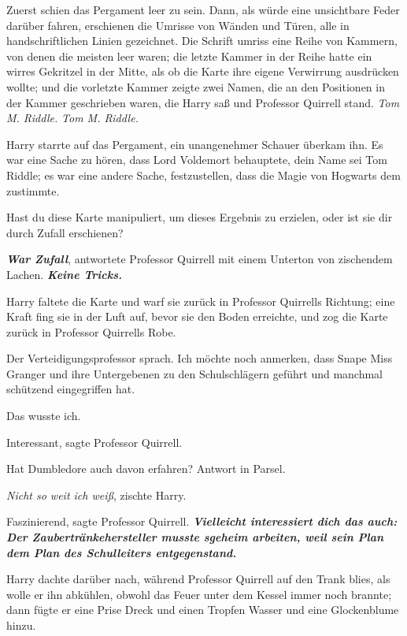 Zuerst schien das Pergament leer zu sein. Dann, als würde eine unsichtbare Feder
darüber fahren, erschienen die Umrisse von Wänden und Türen, alle in
handschriftlichen Linien gezeichnet. Die Schrift umriss eine Reihe von Kammern,
von denen die meisten leer waren; die letzte Kammer in der Reihe hatte ein
wirres Gekritzel in der Mitte, als ob die Karte ihre eigene Verwirrung
ausdrücken wollte; und die vorletzte Kammer zeigte zwei Namen, die an den
Positionen in der Kammer geschrieben waren, die Harry saß und Professor Quirrell
stand. \emph{ Tom M. Riddle.}
\emph{Tom M. Riddle.}

Harry starrte auf das Pergament, ein unangenehmer Schauer überkam ihn. Es war
eine Sache zu hören, dass Lord Voldemort behauptete, dein Name sei Tom Riddle;
es war eine andere Sache, festzustellen, dass die Magie von Hogwarts dem
zustimmte.

\glqq{}Hast du diese Karte manipuliert, um dieses Ergebnis zu erzielen, oder ist
sie dir durch Zufall erschienen?\grqq{}

\glqq{}\textbf{\emph{War Zufall}}\grqq{}, antwortete Professor Quirrell mit einem
Unterton von zischendem Lachen. \glqq{}\textbf{\emph{Keine Tricks.}}\grqq{}

Harry faltete die Karte und warf sie zurück in Professor Quirrells Richtung;
eine Kraft fing sie in der Luft auf, bevor sie den Boden erreichte, und zog die
Karte zurück in Professor Quirrells Robe.

Der Verteidigungsprofessor sprach. \glqq{}Ich möchte noch anmerken, dass Snape
Miss Granger und ihre Untergebenen zu den Schulschlägern geführt und manchmal
schützend eingegriffen hat.\grqq{}

\glqq{}Das wusste ich.\grqq{}

\glqq{}Interessant\grqq{}, sagte Professor Quirrell.

\glqq{}Hat Dumbledore auch davon erfahren? Antwort in Parsel.\grqq{}

\glqq{}\emph{Nicht so weit ich weiß}\grqq{}, zischte Harry.

\glqq{}Faszinierend\grqq{}, sagte Professor Quirrell. \glqq{}
\textbf{\emph{Vielleicht interessiert dich das auch: Der Zaubertränkehersteller
musste sgeheim arbeiten, weil sein Plan dem Plan des Schulleiters
entgegenstand.\grqq{}} }

Harry dachte darüber nach, während Professor Quirrell auf den Trank blies, als
wolle er ihn abkühlen, obwohl das Feuer unter dem Kessel immer noch brannte;
dann fügte er eine Prise Dreck und einen Tropfen Wasser und eine Glockenblume
hinzu.

